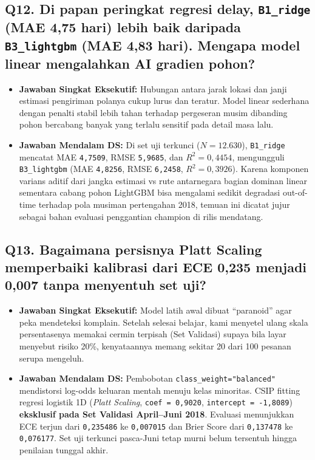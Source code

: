 \documentclass[11pt,a4paper,oneside]{book}
\newcommand{\code}[1]{{\small\nolinkurl{#1}}}
\begin{document}
\subsection*{Q12. Di papan peringkat regresi delay, \texttt{B1\_ridge} (MAE 4,75 hari) lebih baik daripada \texttt{B3\_lightgbm} (MAE 4,83 hari). Mengapa model linear mengalahkan AI gradien pohon?}
\begin{itemize}
  \item \textbf{Jawaban Singkat Eksekutif:} Hubungan antara jarak lokasi dan janji estimasi pengiriman polanya cukup lurus dan teratur. Model linear sederhana dengan penalti stabil lebih tahan terhadap pergeseran musim dibanding pohon bercabang banyak yang terlalu sensitif pada detail masa lalu.
  \item \textbf{Jawaban Mendalam DS:} Di set uji terkunci ($N=12.630$), \code{B1_ridge} mencatat MAE \code{4,7509}, RMSE \code{5,9685}, dan $R^2 = 0{,}4454$, mengungguli \code{B3_lightgbm} (MAE \code{4,8256}, RMSE \code{6,2458}, $R^2 = 0{,}3926$). Karena komponen varians aditif dari jangka estimasi vs rute antarnegara bagian dominan linear sementara cabang pohon LightGBM bisa mengalami sedikit degradasi out-of-time terhadap pola musiman pertengahan 2018, temuan ini dicatat jujur sebagai bahan evaluasi penggantian champion di rilis mendatang.
\end{itemize}

\subsection*{Q13. Bagaimana persisnya Platt Scaling memperbaiki kalibrasi dari ECE 0,235 menjadi 0,007 tanpa menyentuh set uji?}
\begin{itemize}
  \item \textbf{Jawaban Singkat Eksekutif:} Model latih awal dibuat ``paranoid'' agar peka mendeteksi komplain. Setelah selesai belajar, kami menyetel ulang skala persentasenya memakai cermin terpisah (Set Validasi) supaya bila layar menyebut risiko 20\%, kenyataannya memang sekitar 20 dari 100 pesanan serupa mengeluh.
  \item \textbf{Jawaban Mendalam DS:} Pembobotan \code{class_weight="balanced"} mendistorsi log-odds keluaran mentah menuju kelas minoritas. CSIP fitting regresi logistik 1D (\emph{Platt Scaling}, \code{coef = 0,9020}, \code{intercept = -1,8089}) \textbf{eksklusif pada Set Validasi April--Juni 2018}. Evaluasi menunjukkan ECE terjun dari \code{0,235486} ke \code{0,007015} dan Brier Score dari \code{0,137478} ke \code{0,076177}. Set uji terkunci pasca-Juni tetap murni belum tersentuh hingga penilaian tunggal akhir.
\end{itemize}
\end{document}
